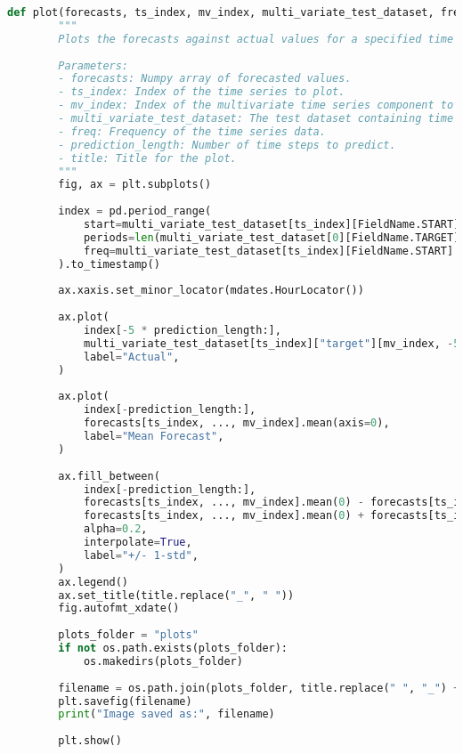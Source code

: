 \begin{lstlisting}[language=Python, caption={Code for evaluating the model’s performance}, breaklines=true, label=code6]
    def plot(forecasts, ts_index, mv_index, multi_variate_test_dataset, freq, prediction_length, title):
        """
        Plots the forecasts against actual values for a specified time series.
    
        Parameters:
        - forecasts: Numpy array of forecasted values.
        - ts_index: Index of the time series to plot.
        - mv_index: Index of the multivariate time series component to plot.
        - multi_variate_test_dataset: The test dataset containing time series data.
        - freq: Frequency of the time series data.
        - prediction_length: Number of time steps to predict.
        - title: Title for the plot.
        """
        fig, ax = plt.subplots()
    
        index = pd.period_range(
            start=multi_variate_test_dataset[ts_index][FieldName.START],
            periods=len(multi_variate_test_dataset[0][FieldName.TARGET][0]),
            freq=multi_variate_test_dataset[ts_index][FieldName.START].freq,
        ).to_timestamp()
    
        ax.xaxis.set_minor_locator(mdates.HourLocator())
    
        ax.plot(
            index[-5 * prediction_length:],
            multi_variate_test_dataset[ts_index]["target"][mv_index, -5 * prediction_length:],
            label="Actual",
        )
    
        ax.plot(
            index[-prediction_length:],
            forecasts[ts_index, ..., mv_index].mean(axis=0),
            label="Mean Forecast",
        )
    
        ax.fill_between(
            index[-prediction_length:],
            forecasts[ts_index, ..., mv_index].mean(0) - forecasts[ts_index, ..., mv_index].std(axis=0),
            forecasts[ts_index, ..., mv_index].mean(0) + forecasts[ts_index, ..., mv_index].std(axis=0),
            alpha=0.2,
            interpolate=True,
            label="+/- 1-std",
        )
        ax.legend()
        ax.set_title(title.replace("_", " "))
        fig.autofmt_xdate()
    
        plots_folder = "plots"
        if not os.path.exists(plots_folder):
            os.makedirs(plots_folder)
    
        filename = os.path.join(plots_folder, title.replace(" ", "_") + ".png")
        plt.savefig(filename)
        print("Image saved as:", filename)
    
        plt.show()
    

\end{lstlisting}